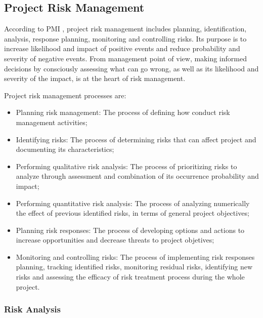 \documentclass[a4paper,twoside]{article}
\begin{document}
\subsection{Project Risk Management}

\noindent According to PMI \cite{PMBOK2008}, project risk management includes planning, identification, analysis, response planning, monitoring and controlling risks. Its purpose is to increase likelihood and impact of positive events and reduce probability and severity of negative events. From management point of view, making informed decisions by consciously assessing what can go wrong, as well as its likelihood and severity of the impact, is at the heart of risk management. %

Project risk management processes are:
\begin{itemize}
\item Planning risk management: The process of defining how conduct risk management activities;
\item Identifying risks: The process of determining risks that can affect project and documenting its characteristics;
\item Performing qualitative risk analysis: The process of prioritizing risks to analyze through assessment and combination of its occurrence probability and impact;
\item Performing quantitative risk analysis: The process of analyzing numerically the effect of previous identified risks, in terms of general project objectives;
\item Planning risk responses: The process of developing options and actions to increase opportunities and decrease threats to project objetives;
\item Monitoring and controlling risks: The process of implementing risk responses planning, tracking identified risks, monitoring residual risks, identifying new risks and assessing the efficacy of risk treatment process during the whole project.
\end{itemize}

\subsubsection{Risk Analysis}
\end{document}
